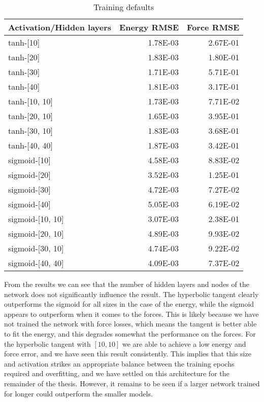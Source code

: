 \begin{table}[H]
\centering
\begin{tabular}{lrr}
\toprule
Activation/Hidden layers &  Energy RMSE &  Force RMSE \\
\midrule
               tanh-[10] &     1.78E-03 &    2.67E-01 \\
               tanh-[20] &     1.83E-03 &    1.80E-01 \\
               tanh-[30] &     1.71E-03 &    5.71E-01 \\
               tanh-[40] &     1.81E-03 &    3.17E-01 \\
           tanh-[10, 10] &     1.73E-03 &    7.71E-02 \\
           tanh-[20, 10] &     1.65E-03 &    3.95E-01 \\
           tanh-[30, 10] &     1.83E-03 &    3.68E-01 \\
           tanh-[40, 40] &     1.87E-03 &    3.42E-01 \\
            sigmoid-[10] &     4.58E-03 &    8.83E-02 \\
            sigmoid-[20] &     3.52E-03 &    1.25E-01 \\
            sigmoid-[30] &     4.72E-03 &    7.27E-02 \\
            sigmoid-[40] &     5.05E-03 &    6.19E-02 \\
        sigmoid-[10, 10] &     3.07E-03 &    2.38E-01 \\
        sigmoid-[20, 10] &     4.89E-03 &    9.93E-02 \\
        sigmoid-[30, 10] &     4.74E-03 &    9.22E-02 \\
        sigmoid-[40, 40] &     4.09E-03 &    7.37E-02 \\
\bottomrule
\end{tabular}
\caption{Training defaults}
\label{table:act-hidden}
\end{table}

From the results we can see that the number of hidden layers
and nodes of the network does not significantly influence the result.
The hyperbolic tangent clearly
outperforms the sigmoid for all sizes in the case of the energy,
while the sigmoid appears to outperform when it comes to the forces.
This is likely because we have not trained the network with force losses,
which means the tangent is better able to fit the energy, and this
degrades somewhat the performance on the forces.
For the hyperbolic tangent with $\left[10, 10\right]$ we are able
to achieve a low energy and force error, and we have seen this result
consistently.
This implies that this size and activation strikes an appropriate balance
between the training epochs required and overfitting, and we have settled
on this architecture for the remainder of the thesis.
However, it remains to be seen if a larger network trained for longer
could outperform the smaller models.

